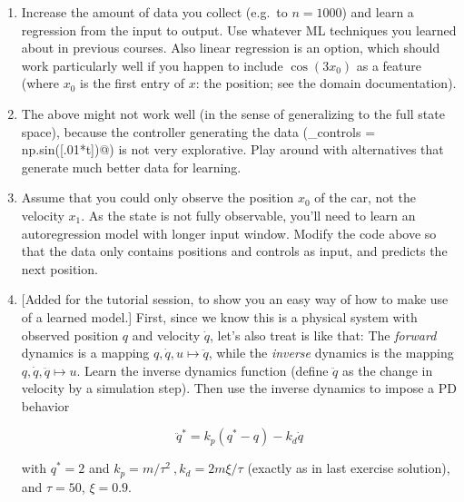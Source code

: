 \begin{enumerate}
\item Increase the amount of data you collect (e.g.\ to $n=1000$) and learn a regression from the input to output. Use whatever ML techniques you learned about in previous courses. Also linear regression is an option, which should work particularly well if you happen to include $\cos(3 x_0)$ as a feature (where $x_0$ is the first entry of $x$: the position; see the domain documentation).

\item The above might not work well (in the sense of generalizing to the full state space), because the controller generating the data (\verb@u_controls = np.sin([.01*t])@) is not very explorative. Play around with alternatives that generate much better data for learning.


\item Assume that you could only observe the position $x_0$ of the car, not the velocity $x_1$. As the state is not fully observable, you'll need to learn an autoregression model with longer input window. Modify the code above so that the data only contains positions and controls as input, and predicts the next position.


\item {}[Added for the tutorial session, to show you an easy way of how to make use of a learned model.] First, since we know this is a physical system with observed position $q$ and velocity $\dot q$, let's also treat is like that: The \emph{forward} dynamics is a mapping $q, \dot q, u \mapsto \ddot q$, while the \emph{inverse} dynamics is the mapping $q, \dot q, \ddot q \mapsto u$. Learn the inverse dynamics function (define $\ddot q$ as the change in velocity by a simulation step). Then use the inverse dynamics to impose a PD behavior

$$\ddot q^* = k_p (q^* - q) - k_d \dot q$$

with $q^* = 2$ and $k_p = m/\tau^2 ~, k_d = 2m\xi/\tau$ (exactly as in last exercise solution), and $\tau = 50$, $\xi = 0.9$.

\end{enumerate}


\ifthenelse{\isundefined{\scripthead}}{


}{}


\exerfoot
